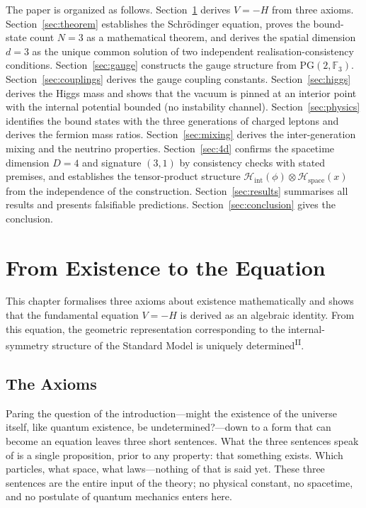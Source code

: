 \documentclass[12pt,a4paper]{article}
\newcommand{\PII}{\textsuperscript{\textup{II}}}
\begin{document}
The paper is organized as follows.
Section~\ref{sec:chain} derives $V = -H$ from three axioms.
Section~\ref{sec:theorem} establishes the Schr\"odinger equation,
proves the bound-state count $N = 3$ as a mathematical theorem, and
derives the spatial dimension $d = 3$ as the unique common solution
of two independent realisation-consistency conditions.
Section~\ref{sec:gauge} constructs the gauge structure from
$\mathrm{PG}(2,\mathbb{F}_3)$.
Section~\ref{sec:couplings} derives the gauge coupling constants.
Section~\ref{sec:higgs} derives the Higgs mass and shows that the vacuum is pinned at an interior point with the internal potential bounded (no instability channel).
Section~\ref{sec:physics} identifies the bound states with the three generations of charged leptons and derives the fermion mass ratios.
Section~\ref{sec:mixing} derives the inter-generation mixing and the neutrino properties.
Section~\ref{sec:4d} confirms the spacetime dimension $D = 4$ and signature $(3,1)$ by consistency checks with stated premises, and establishes the tensor-product structure $\mathcal{H}_\mathrm{int}(\phi) \otimes \mathcal{H}_\mathrm{space}(x)$ from the independence of the construction.
Section~\ref{sec:results} summarises all results and
presents falsifiable predictions.
Section~\ref{sec:conclusion} gives the conclusion.


\section{From Existence to the Equation}\label{sec:chain}

This chapter formalises three axioms about existence mathematically
and shows that the fundamental equation $V = -H$ is derived as an
algebraic identity.
From this equation, the geometric representation corresponding to the
internal-symmetry structure of the Standard Model is uniquely
determined\PII{}.

\subsection{The Axioms}

Paring the question of the introduction---might the existence of the universe itself, like quantum existence, be undetermined?---down to a form that can become an equation leaves three short sentences. What the three sentences speak of is a single proposition, prior to any property: that something exists. Which particles, what space, what laws---nothing of that is said yet. These three sentences are the entire input of the theory; no physical constant, no spacetime, and no postulate of quantum mechanics enters here.
\end{document}
